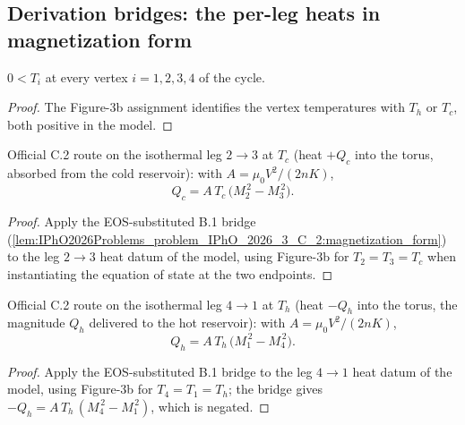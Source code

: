 \subsection*{Derivation bridges: the per-leg heats in magnetization form}

\begin{lemma}
\label{lem:IPhO2026Problems_problem_IPhO_2026_3_C_2:vertex_T_pos}
$0 < T_i$ at every vertex $i = 1, 2, 3, 4$ of the cycle.
\end{lemma}
\begin{proof}
The Figure-3b assignment identifies the vertex temperatures with
$T_h$ or $T_c$, both positive in the model.
\end{proof}

\begin{lemma}
\label{lem:IPhO2026Problems_problem_IPhO_2026_3_C_2:Qc_eq}
Official C.2 route on the isothermal leg $2 \to 3$ at $T_c$ (heat
$+Q_c$ into the torus, absorbed from the cold reservoir): with
$A = \mu_0 V^2/(2nK)$,
\[
Q_c = A\,T_c\,\bigl(M_2^{\,2} - M_3^{\,2}\bigr).
\]
\end{lemma}
\begin{proof}
Apply the EOS-substituted B.1 bridge
(\cref{lem:IPhO2026Problems_problem_IPhO_2026_3_C_2:magnetization_form})
to the leg $2 \to 3$ heat datum of the model, using Figure-3b for
$T_2 = T_3 = T_c$ when instantiating the equation of state at the two
endpoints.
\end{proof}

\begin{lemma}
\label{lem:IPhO2026Problems_problem_IPhO_2026_3_C_2:Qh_eq}
Official C.2 route on the isothermal leg $4 \to 1$ at $T_h$ (heat
$-Q_h$ into the torus, the magnitude $Q_h$ delivered to the hot
reservoir): with $A = \mu_0 V^2/(2nK)$,
\[
Q_h = A\,T_h\,\bigl(M_1^{\,2} - M_4^{\,2}\bigr).
\]
\end{lemma}
\begin{proof}
Apply the EOS-substituted B.1 bridge to the leg $4 \to 1$ heat datum
of the model, using Figure-3b for $T_4 = T_1 = T_h$; the bridge gives
$-Q_h = A\,T_h\,(M_4^{\,2} - M_1^{\,2})$, which is negated.
\end{proof}

